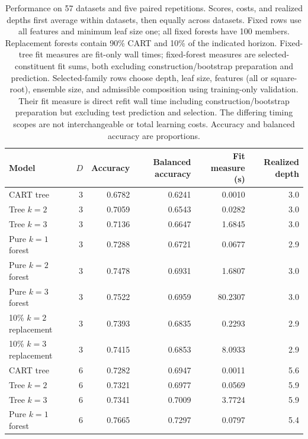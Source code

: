 \begin{table}[t]
\centering\small
\caption{Performance on 57 datasets and five paired repetitions. Scores,
costs, and realized depths first average within datasets, then equally
across datasets. Fixed rows use all features and minimum leaf size one;
all fixed forests have 100 members. Replacement forests contain 90\%
CART and 10\% of the indicated horizon. Fixed-tree fit measures are
fit-only wall times; fixed-forest measures are selected-constituent fit
sums, both excluding construction/bootstrap preparation and prediction.
Selected-family rows choose depth, leaf size, features (all or square-root),
ensemble size, and admissible composition using training-only validation.
Their fit measure is direct refit wall time including construction/bootstrap
preparation but excluding test prediction and selection. The differing
timing scopes are not interchangeable or total learning costs. Accuracy
and balanced accuracy are proportions.}
\label{tab:performance}
\begin{tabular}{@{}lrrrrr@{}}\toprule
Model & $D$ & Accuracy & Balanced accuracy & Fit measure (s) & Realized depth\\
\midrule
CART tree & 3 & 0.6782 & 0.6241 & 0.0010 & 3.0 \\
Tree $k=2$ & 3 & 0.7059 & 0.6543 & 0.0282 & 3.0 \\
Tree $k=3$ & 3 & 0.7136 & 0.6647 & 1.6845 & 3.0 \\
Pure $k=1$ forest & 3 & 0.7288 & 0.6721 & 0.0677 & 2.9 \\
Pure $k=2$ forest & 3 & 0.7478 & 0.6931 & 1.6807 & 3.0 \\
Pure $k=3$ forest & 3 & 0.7522 & 0.6959 & 80.2307 & 3.0 \\
10\% $k=2$ replacement & 3 & 0.7393 & 0.6835 & 0.2293 & 2.9 \\
10\% $k=3$ replacement & 3 & 0.7415 & 0.6853 & 8.0933 & 2.9 \\
\addlinespace
CART tree & 6 & 0.7282 & 0.6947 & 0.0011 & 5.6 \\
Tree $k=2$ & 6 & 0.7321 & 0.6977 & 0.0569 & 5.9 \\
Tree $k=3$ & 6 & 0.7341 & 0.7009 & 3.7724 & 5.9 \\
Pure $k=1$ forest & 6 & 0.7665 & 0.7297 & 0.0797 & 5.4 \\

\end{tabular}
\end{table}
